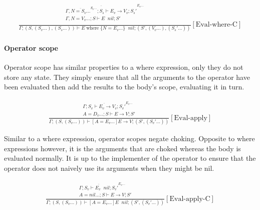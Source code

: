 \documentclass{scrartcl}
\DeclareMathOperator{\where}{where}
\DeclareMathOperator{\ceval}{\overset{C}{\rightarrow}}
\begin{document}
    \begin{align*}
    \frac{
        \begin{matrix}
        \overline{\Gamma, \overline{N=S_v...}^{S_v...}; S_s \vdash E_v \rightarrow V_v; S_s'}^{E_v...} \\
        \Gamma, N=V_v...; S \vdash E \ceval nil; S' \\
        \end{matrix}
    }{
        \Gamma; (S, (S_v...), (S_s...)) \vdash E \where \{ N=E_v... \} \ceval nil; (S', (V_v...), (S_s'...))
    }[\text{Eval-where-C}]
    \end{align*}
    
    \paragraph{Operator scope}
    
    Operator scope has similar properties to a where expression, only they do not store any state. They simply ensure that all the arguments to the operator have been evaluated then add the results to the body's scope, evaluating it in turn.
    
    \begin{align*}
    \frac{
        \begin{matrix}
        \overline{\Gamma; S_v \vdash E_v \rightarrow V_v; S_v'}^{E_v...} \\
        A = D_v...; S \vdash E \rightarrow V; S'
        \end{matrix}
    }{
        \Gamma; (S, (S_v...)) \vdash [A=E_v...]E \rightarrow V; (S', (S_v'...))
    }[\text{Eval-apply}]
    \end{align*}
    
    Similar to a where expression, operator scopes negate choking. Opposite to where expressions however, it is the arguments that are choked whereas the body is evaluated normally. It is up to the implementer of the operator to ensure that the operator does not naively use its arguments when they might be nil.
    
    \begin{align*}
    \frac{
        \begin{matrix}
        \overline{\Gamma; S_v \vdash E_v \ceval nil; S_v'}^{E_v...} \\
        A = nil...; S \vdash E \rightarrow V; S'
        \end{matrix}
    }{
        \Gamma; (S, (S_v...)) \vdash [A=E_v...]E \ceval nil; (S', (S_v'...))
    }[\text{Eval-apply-C}]
    \end{align*}
    
\end{document}
